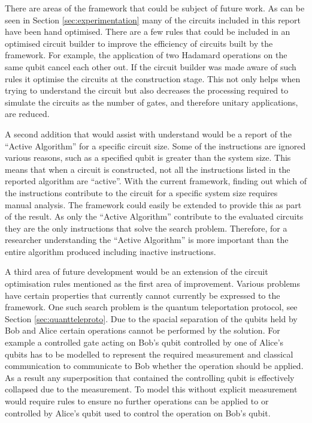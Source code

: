 There are areas of the framework that could be subject of future work.
As can be seen in Section \ref{sec:experimentation} many of the circuits included in this report have been hand optimised.
There are a few rules that could be included in an optimised circuit builder to improve the efficiency of circuits built by the framework.
For example, the application of two Hadamard operations on the same qubit cancel each other out.
If the circuit builder was made aware of such rules it optimise the circuits at the construction stage.
This not only helps when trying to understand the circuit but also decreases the processing required to simulate the circuits as the number of gates, and therefore unitary applications, are reduced.

A second addition that would assist with understand would be a report of the ``Active Algorithm'' for a specific circuit size.
Some of the instructions are ignored various reasons, such as a specified qubit is greater than the system size.
This means that when a circuit is constructed, not all the instructions listed in the reported algorithm are ``active''.
With the current framework, finding out which of the instructions contribute to the circuit for a specific system size requires manual analysis.
The framework could easily be extended to provide this as part of the result.
As only the ``Active Algorithm'' contribute to the evaluated circuits they are the only instructions that solve the search problem.
Therefore, for a researcher understanding the ``Active Algorithm'' is more important than the entire algorithm produced including inactive instructions.

A third area of future development would be an extension of the circuit optimisation rules mentioned as the first area of improvement.
Various problems have certain properties that currently cannot currently be expressed to the framework.
One such search problem is the quantum teleportation protocol, see Section \ref{sec:quantteleproto}.
Due to the spacial separation of the qubits held by Bob and Alice certain operations cannot be performed by the solution.
For example a controlled gate acting on Bob's qubit controlled by one of Alice's qubits has to be modelled to represent the required measurement and classical communication to communicate to Bob whether the operation should be applied.
As a result any superposition that contained the controlling qubit is effectively collapsed due to the measurement.
To model this without explicit measurement would require rules to ensure no further operations can be applied to or controlled by Alice's qubit used to control the operation on Bob's qubit.

